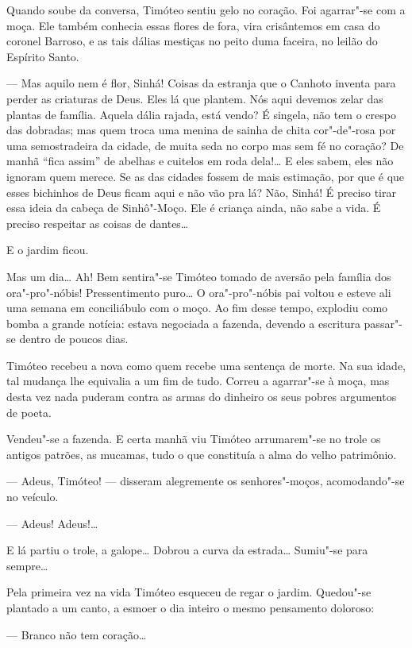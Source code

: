 Quando soube da conversa, Timóteo sentiu gelo no coração. Foi agarrar"-se
com a moça. Ele também conhecia essas flores de fora, vira crisântemos
em casa do coronel Barroso, e as tais dálias mestiças no peito duma
faceira, no leilão do Espírito Santo.

--- Mas aquilo nem é flor, Sinhá! Coisas da estranja que o Canhoto
inventa para perder as criaturas de Deus. Eles lá que plantem. Nós aqui
devemos zelar das plantas de família. Aquela dália rajada, está vendo? É
singela, não tem o crespo das dobradas; mas quem troca uma menina de
sainha de chita cor"-de"-rosa por uma semostradeira da cidade, de muita
seda no corpo mas sem fé no coração? De manhã ``fica assim'' de abelhas
e cuitelos em roda dela!\ldots{} E eles sabem, eles não ignoram quem merece.
Se as das cidades fossem de mais estimação, por que é que esses
bichinhos de Deus ficam aqui e não vão pra lá? Não, Sinhá! É preciso
tirar essa ideia da cabeça de Sinhô"-Moço. Ele é criança ainda, não sabe
a vida. É preciso respeitar as coisas de dantes\ldots{}

E o jardim ficou.

Mas um dia\ldots{} Ah! Bem sentira"-se Timóteo tomado de aversão pela família
dos ora"-pro"-nóbis! Pressentimento puro\ldots{} O ora"-pro"-nóbis pai voltou e
esteve ali uma semana em conciliábulo com o moço. Ao fim desse tempo,
explodiu como bomba a grande notícia: estava negociada a fazenda,
devendo a escritura passar"-se dentro de poucos dias.

Timóteo recebeu a nova como quem recebe uma sentença de morte. Na sua
idade, tal mudança lhe equivalia a um fim de tudo. Correu a agarrar"-se à
moça, mas desta vez nada puderam contra as armas do dinheiro os seus
pobres argumentos de poeta.

Vendeu"-se a fazenda. E certa manhã viu Timóteo arrumarem"-se no trole os
antigos patrões, as mucamas, tudo o que constituía a alma do velho
patrimônio.

--- Adeus, Timóteo! --- disseram alegremente os senhores"-moços,
acomodando"-se no veículo.

--- Adeus! Adeus!\ldots{}

E lá partiu o trole, a galope\ldots{} Dobrou a curva da estrada\ldots{} Sumiu"-se
para sempre\ldots{}

Pela primeira vez na vida Timóteo esqueceu de regar o jardim. Quedou"-se
plantado a um canto, a esmoer o dia inteiro o mesmo pensamento doloroso:

--- Branco não tem coração\ldots{}

